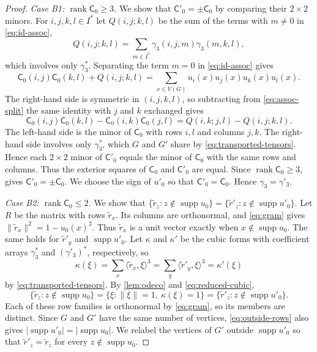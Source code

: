 \documentclass[10pt,a4paper]{article}
\theoremstyle{plain}
\theoremstyle{definition}
\DeclareMathOperator{\supp}{supp}
\DeclareMathOperator{\rank}{rank}
\begin{document}
\begin{proof}
  \emph{Case B1: $\rank \mathsf{C}_0 \geq 3$.} We show that
  $\mathsf C'_0=\pm\mathsf{C}_0$ by comparing their $2\times2$ minors.
  For $i,j,k,l \in I^{*}$ let $Q(i,j;k,l)$ be the sum of the terms with
  $m\neq0$ in \cref{eq:id-assoc},
  \begin{equation}\label{eq:q-tensor}
   Q(i,j;k,l) = \sum_{m \in I^{*}} \gamma_3(i,j,m) \gamma_3(m,k,l),
  \end{equation}
  which involves only $\gamma_3^*$.
  Separating the term $m=0$ in \cref{eq:id-assoc} gives
  \begin{equation}
    \label{eq:assoc-split}
    \mathsf{C}_0(i,j)\mathsf{C}_0(k,l)+Q(i,j;k,l)
    =\sum_{x \in V(G)} u_i(x) u_j(x) u_k(x) u_l(x).
  \end{equation}
  The right-hand side is symmetric in $(i,j,k,l)$, so subtracting from
  \cref{eq:assoc-split} the same identity with $j$ and $k$ exchanged
  gives
  \begin{equation}
    \label{eq:minors}
    \mathsf{C}_0(i,j) \mathsf{C}_0(k,l) - \mathsf{C}_0(i,k) \mathsf{C}_0(j,l) = Q(i,k;j,l) - Q(i,j;k,l).
  \end{equation}
  The left-hand side is the minor of $\mathsf{C}_0$ with rows $i,l$ and
  columns $j,k$. The right-hand side involves only $\gamma_3^*$,
  which $G$ and $G'$ share by \cref{eq:transported-tensors}. Hence each
  $2\times2$ minor of $\mathsf C'_0$ equals the minor of
  $\mathsf{C}_0$ with the same rows and columns.
  Thus the exterior squares of $\mathsf C_0$ and $\mathsf C'_0$ are equal.
  Since $\rank\mathsf C_0\geq3$, \cite[Corollary~4.1]{Greenhill1999}
  gives $\mathsf C'_0=\pm\mathsf C_0$.
  We choose the sign of $u'_0$ so that $\mathsf C'_0=\mathsf{C}_0$.
  Hence $\gamma_3=\gamma'_3$.

  \emph{Case B2: $\rank \mathsf{C}_0 \leq 2$.} We show that
  $\{\tilde{r}_z:z\notin\supp u_0\}=\{\tilde{r}'_z:z\notin\supp u'_0\}$.
  Let $R$ be the matrix with rows $\tilde{r}_x$. Its columns are
  orthonormal, and \cref{eq:gram} gives
  $\lVert\tilde{r}_x\rVert^2=1-u_0(x)^2$.
  Thus $\tilde{r}_x$ is a unit vector exactly when $x\notin\supp u_0$.
  The same holds for $\tilde{r}'_y$ and $\supp u'_0$.
  Let $\kappa$ and $\kappa'$ be the cubic forms with coefficient
  arrays $\gamma_3^*$ and $(\gamma'_3)^*$, respectively, so
  \begin{equation}\label{eq:reduced-cubic}
   \kappa(\xi)=\sum_x\langle\tilde{r}_x,\xi\rangle^3
   =\sum_y\langle\tilde{r}'_y,\xi\rangle^3=\kappa'(\xi)
  \end{equation}
  by \cref{eq:transported-tensors}.
  By \cref{lem:odeco} and \cref{eq:reduced-cubic},
  \begin{equation}\label{eq:outside-rows}
   \{\tilde{r}_z:z\notin\supp u_0\}
   =\{\xi:\lVert \xi\rVert=1,\ \kappa(\xi)=1\}
   =\{\tilde{r}'_z:z\notin\supp u'_0\}.
  \end{equation}
  Each of these row families is orthonormal by \cref{eq:gram}, so its
  members are distinct. Since $G$ and $G'$ have the same number of
  vertices, \cref{eq:outside-rows} also gives
  $|\supp u'_0|=|\supp u_0|$.
  We relabel the vertices of $G'$ outside $\supp u'_0$ so that
  $\tilde{r}'_z=\tilde{r}_z$ for every $z\notin\supp u_0$.


\end{proof}
\end{document}
